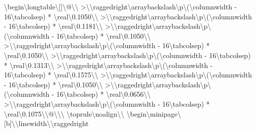 \textbackslash{}begin\textbackslash{}{longtable\textbackslash{}}[]\textbackslash{}{@\textbackslash{}{\textbackslash{}}
  >\textbackslash{}{\textbackslash{}raggedright\textbackslash{}arraybackslash\textbackslash{}}p\textbackslash{}{(\textbackslash{}columnwidth - 16\textbackslash{}tabcolsep) * \textbackslash{}real\textbackslash{}{0.1050\textbackslash{}}\textbackslash{}}
  >\textbackslash{}{\textbackslash{}raggedright\textbackslash{}arraybackslash\textbackslash{}}p\textbackslash{}{(\textbackslash{}columnwidth - 16\textbackslash{}tabcolsep) * \textbackslash{}real\textbackslash{}{0.1181\textbackslash{}}\textbackslash{}}
  >\textbackslash{}{\textbackslash{}raggedright\textbackslash{}arraybackslash\textbackslash{}}p\textbackslash{}{(\textbackslash{}columnwidth - 16\textbackslash{}tabcolsep) * \textbackslash{}real\textbackslash{}{0.1050\textbackslash{}}\textbackslash{}}
  >\textbackslash{}{\textbackslash{}raggedright\textbackslash{}arraybackslash\textbackslash{}}p\textbackslash{}{(\textbackslash{}columnwidth - 16\textbackslash{}tabcolsep) * \textbackslash{}real\textbackslash{}{0.1050\textbackslash{}}\textbackslash{}}
  >\textbackslash{}{\textbackslash{}raggedright\textbackslash{}arraybackslash\textbackslash{}}p\textbackslash{}{(\textbackslash{}columnwidth - 16\textbackslash{}tabcolsep) * \textbackslash{}real\textbackslash{}{0.1313\textbackslash{}}\textbackslash{}}
  >\textbackslash{}{\textbackslash{}raggedright\textbackslash{}arraybackslash\textbackslash{}}p\textbackslash{}{(\textbackslash{}columnwidth - 16\textbackslash{}tabcolsep) * \textbackslash{}real\textbackslash{}{0.1575\textbackslash{}}\textbackslash{}}
  >\textbackslash{}{\textbackslash{}raggedright\textbackslash{}arraybackslash\textbackslash{}}p\textbackslash{}{(\textbackslash{}columnwidth - 16\textbackslash{}tabcolsep) * \textbackslash{}real\textbackslash{}{0.1050\textbackslash{}}\textbackslash{}}
  >\textbackslash{}{\textbackslash{}raggedright\textbackslash{}arraybackslash\textbackslash{}}p\textbackslash{}{(\textbackslash{}columnwidth - 16\textbackslash{}tabcolsep) * \textbackslash{}real\textbackslash{}{0.0656\textbackslash{}}\textbackslash{}}
  >\textbackslash{}{\textbackslash{}raggedright\textbackslash{}arraybackslash\textbackslash{}}p\textbackslash{}{(\textbackslash{}columnwidth - 16\textbackslash{}tabcolsep) * \textbackslash{}real\textbackslash{}{0.1075\textbackslash{}}\textbackslash{}}@\textbackslash{}{\textbackslash{}}\textbackslash{}}
\textbackslash{}toprule\textbackslash{}noalign\textbackslash{}{\textbackslash{}}
\textbackslash{}begin\textbackslash{}{minipage\textbackslash{}}[b]\textbackslash{}{\textbackslash{}linewidth\textbackslash{}}\textbackslash{}raggedright
